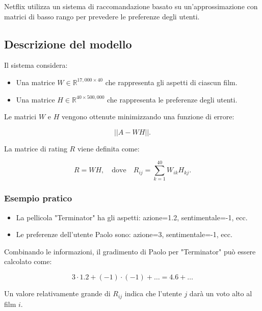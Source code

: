 \documentclass[a4paper, 11pt]{article}
\begin{document}
            Netflix utilizza un sistema di raccomandazione basato su un'approssimazione con matrici di basso rango per prevedere le preferenze degli utenti.

            \subsection*{Descrizione del modello}
            Il sistema considera:
            \begin{itemize}
                \item Una matrice $W \in \mathbb{R}^{17,000 \times 40}$ che rappresenta gli aspetti di ciascun film.
                \item Una matrice $H \in \mathbb{R}^{40 \times 500,000}$ che rappresenta le preferenze degli utenti.
            \end{itemize}

            Le matrici $W$ e $H$ vengono ottenute minimizzando una funzione di errore:



            \[
            ||A - WH||.
            \]



            La matrice di rating $R$ viene definita come:



            \[
            R = WH, \quad \text{dove} \quad R_{ij} = \sum_{k=1}^{40} W_{ik} H_{kj}.
            \]



            \subsubsection*{Esempio pratico}
            \begin{itemize}
                \item La pellicola "Terminator" ha gli aspetti: azione=1.2, sentimentale=-1, ecc.
                \item Le preferenze dell'utente Paolo sono: azione=3, sentimentale=-1, ecc.
            \end{itemize}

            Combinando le informazioni, il gradimento di Paolo per "Terminator" può essere calcolato come:



            \[
            3 \cdot 1.2 + (-1) \cdot (-1) + \ldots = 4.6 + \ldots
            \]



            Un valore relativamente grande di \( R_{ij} \) indica che l'utente $j$ darà un voto alto al film $i$.
\end{document}
